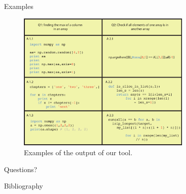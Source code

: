 \documentclass{beamer}
\begin{document}
    \begin{frame}{Examples}
      \begin{figure}[h]
          \includegraphics[width=0.75\textwidth]{resources/concrete_examples.pdf}
          \caption{Examples of the output of our tool.}
          
          \label{fig:concrete-examples}
        \end{figure}
    \end{frame}



\begin{frame}[c]

\begin{center}
\LARGE Questions?
\end{center}

\end{frame}



    
\appendix
    \begin{frame}[label=bibliography]{Bibliography}
      
      
      
    \end{frame}

  
\end{document}
